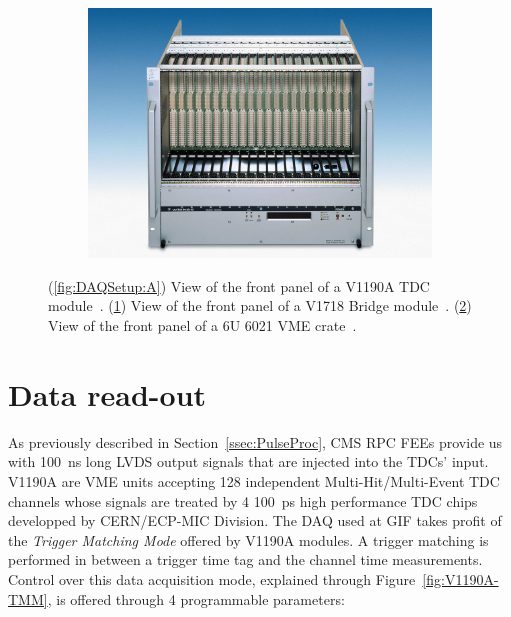 \begin{figure}[H]
\begin{subfigure}{0.5\linewidth}
			\caption{\label{fig:DAQSetup:B}}
		\end{subfigure}
		\begin{subfigure}{\linewidth}
		    \centering
			\includegraphics[width = 0.8\plotwidth]{fig/app1/Wiener-front.png}
			\caption{\label{fig:DAQSetup:C}}
		\end{subfigure}
		\caption{\label{fig:DAQSetup} (\ref{fig:DAQSetup:A}) View of the front panel of a V1190A TDC module~\cite{V1190AMUT}. (\ref{fig:DAQSetup:B}) View of the front panel of a V1718 Bridge module~\cite{V1718MUT}. (\ref{fig:DAQSetup:C}) View of the front panel of a 6U 6021 VME crate~\cite{6U6000MUT}.}
	\end{figure}

\section{Data read-out}

	As previously described in Section~\ref{ssec:PulseProc}, CMS RPC FEEs provide us with \SI{100}{ns} long LVDS output signals that are injected into the TDCs' input. V1190A are VME units accepting 128 independent Multi-Hit/Multi-Event TDC channels whose signals are treated by 4 \SI{100}{ps} high performance TDC chips developped by CERN/ECP-MIC Division. The DAQ used at GIF takes profit of the \textit{Trigger Matching Mode} offered by V1190A modules. A trigger matching is performed in between a trigger time tag and the channel time measurements. Control over this data acquisition mode, explained through Figure~\ref{fig:V1190A-TMM}, is offered through 4 programmable parameters:
        
